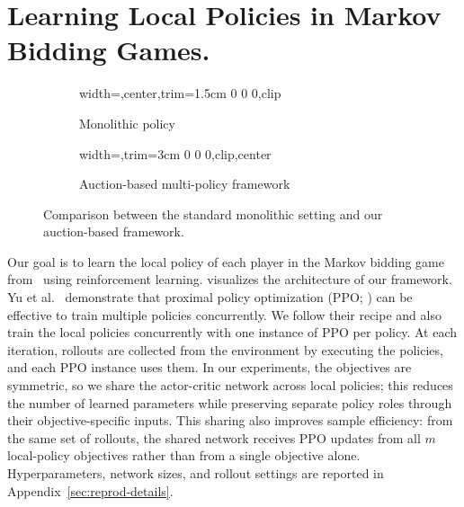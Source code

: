 \section{Learning Local Policies in Markov Bidding Games.}\label{sec:learning-local-policies}

\begin{figure}[t]
  \centering
  \begin{subfigure}[t]{0.28\textwidth}
    \centering
    \begin{adjustbox}{width=\linewidth,center,trim=1.5cm 0 0 0,clip}
      
    \end{adjustbox}
    \caption{Monolithic policy}
    \label{fig:standard_control_overview}
  \end{subfigure}
  \hfill
  \begin{subfigure}[t]{0.7\textwidth}
    \centering
    \begin{adjustbox}{width=\linewidth,trim=3cm 0 0 0,clip,center}
      
    \end{adjustbox}
    \caption{Auction-based multi-policy framework}
    \label{fig:modular_auction_overview}
  \end{subfigure}

  \caption{Comparison between the standard monolithic setting and our auction-based framework.}
  \label{fig:intro_control_overview}
\end{figure}

Our goal is to learn the local policy of each player in the Markov bidding game from~ using reinforcement learning.
 visualizes the architecture of our framework.
Yu et al.~\cite{yu2022mappo} demonstrate that proximal policy optimization (PPO; \cite{schulman2017ppo}) can be effective to train multiple policies concurrently.
We follow their recipe and also train the local policies concurrently with one instance of PPO per policy.
At each iteration, rollouts are collected from the environment by executing the policies, and each PPO instance uses them.
In our experiments, the objectives are symmetric, so we share the actor-critic network across local policies; this reduces the number of learned parameters while preserving separate policy roles through their objective-specific inputs.
This sharing also improves sample efficiency: from the same set of rollouts, the shared network receives PPO updates from all $m$ local-policy objectives rather than from a single objective alone.
Hyperparameters, network sizes, and rollout settings are reported in Appendix~\ref{sec:reprod-details}.

